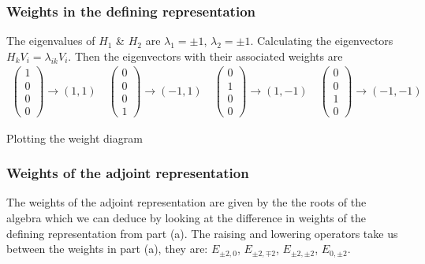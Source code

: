 \documentclass[main.tex]{subfiles}
\begin{document}
\subsubsection{Weights in the defining representation}
The eigenvalues of $H_1$ \& $H_2$ are $\lambda_1=\pm1$, $\lambda_2=\pm1$. Calculating the eigenvectors $H_kV_i=\lambda_{ik}V_i$.
Then the eigenvectors with their associated weights are
\begin{align}
\begin{pmatrix}1\\0\\0\\0\end{pmatrix}\rightarrow(1,1)\quad \begin{pmatrix}0\\0\\0\\1\end{pmatrix}\rightarrow(-1,1)\quad
\begin{pmatrix}0\\1\\0\\0\end{pmatrix}\rightarrow(1,-1)\quad \begin{pmatrix}0\\0\\1\\0\end{pmatrix}\rightarrow(-1,-1)
\end{align}

Plotting the weight diagram 
\begin{figure}[H]
\centering
{}
\end{figure}
 
\subsubsection{Weights of the adjoint representation}
The weights of the adjoint representation are given by the the roots of the algebra which we can deduce by looking at the difference in weights of the defining representation from part (a). The raising and lowering operators take us between the weights in part (a), they are: $E_{\pm2,0}$, $E_{\pm2,\mp2}$, $E_{\pm2,\pm2}$, $E_{0,\pm2}$.
\end{document}
